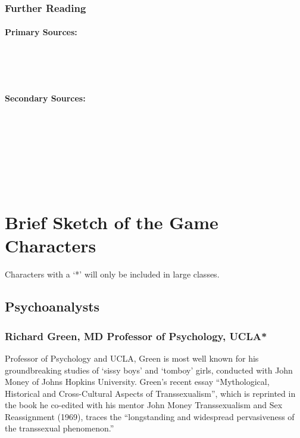 \begin{refsection}
\subsubsection{Further Reading}
\label{furtherreading}

\paragraph{Primary Sources:}
\label{primarysources:}

~\citep{Miller:1956trb}

~\citep{Miller:1962vk}

\paragraph{Secondary Sources:}
\label{secondarysources:}

~\citep{Bechtel:1999vr}

~\citep{Baars:i5QbNrcs}

~\citep{Leahey:2002tt}

~\citep{Stillings:1995to}

\section{Brief Sketch of the Game Characters}
\label{briefsketchofthegamecharacters}

Characters with a `*' will only be included in large classes.

\subsection{Psychoanalysts}
\label{psychoanalysts}

\subsubsection{Richard Green, MD Professor of Psychology, UCLA*}
\label{richardgreenmdprofessorofpsychologyucla}

Professor of Psychology and UCLA, Green is most well known for his groundbreaking studies of `sissy boys' and `tomboy' girls, conducted with John Money of Johns Hopkins University. Green's recent essay ``Mythological, Historical and Cross-Cultural Aspects of Transsexualism'', which is reprinted in the book he co-edited with his mentor John Money Transsexualism and Sex Reassignment (1969), traces the ``longstanding and widespread pervasiveness of the transsexual phenomenon.''


\end{refsection}
